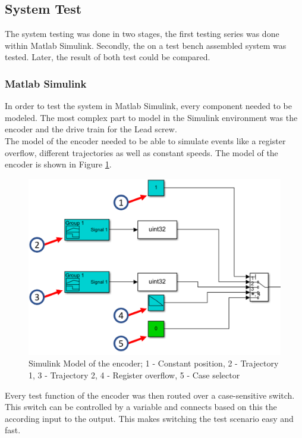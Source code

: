  
\subsection{System Test}
The system testing was done in two stages, the first testing series was done within Matlab Simulink. Secondly, the on a test bench assembled system was tested. Later, the result of both test could be compared.
 
\subsubsection{Matlab Simulink}
In order to test the system in Matlab Simulink, every component needed to be modeled. The most complex part to model in the Simulink environment was the encoder and the drive train for the Lead screw.\\
The model of the encoder needed to be able to simulate events like a register overflow, different trajectories as well as constant speeds. The model of the encoder is shown in Figure \ref{SysEnc}.
 
\begin{figure}
    \begin{center}
    \includegraphics[width=12cm]{Pictures/SysEnc.png}
    \caption[Simulink Model of the encoder]{Simulink Model of the encoder; 1 - Constant position, 2 - Trajectory 1, 3 - Trajectory 2, 4 - Register overflow, 5 - Case selector}
    \label{SysEnc}
    \end{center}
\end{figure}
 
Every test function of the encoder was then routed over a case-sensitive switch. This switch can be controlled by a variable and connects based on this the according input to the output. This makes switching the test scenario easy and fast.\\
 
